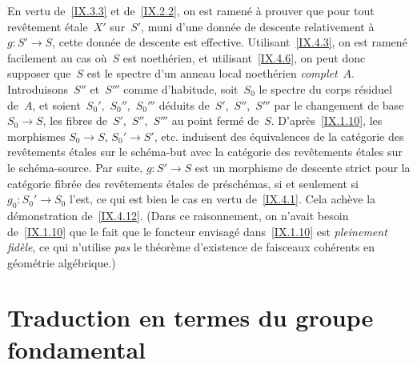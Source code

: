 En vertu de~\ref{IX.3.3} et de~\ref{IX.2.2}, on est ramen\'e \`a
prouver que pour tout rev\^etement \'etale~$X'$ sur~$S'$, muni
d'une donn\'ee de descente relativement \`a $g\colon S'\to S$,
cette donn\'ee de descente est effective. Utilisant~\ref{IX.4.3},
on est ramen\'e facilement
au cas o\`u~$S$ est noeth\'erien, et utilisant~\ref{IX.4.6}, on
peut donc supposer que~$S$ est le spectre d'un anneau local
noeth\'erien \emph{complet}~$A$. Introduisons~$S''$ et~$S'''$ comme
d'habitude, soit~$S_0$ le spectre du corps r\'esiduel de~$A$, et
soient~$S_0'$,~$S_0''$,~$S_0'''$ d\'eduits de~$S'$,~$S''$,~$S'''$
par le changement de base $S_0\to S$, \ie les fibres
de~$S'$,~$S''$,~$S'''$ au point ferm\'e de~$S$.
D'apr\`es~\ref{IX.1.10}, les morphismes $S_0\to S$, $S_0'\to S'$,
etc. induisent des \'equivalences de la cat\'egorie des
rev\^etements \'etales sur le sch\'ema-but avec la cat\'egorie
des rev\^etements \'etales sur le sch\'ema-source. Par suite,
$g\colon S'\to S$ est un morphisme de descente strict pour la
cat\'egorie fibr\'ee des rev\^etements \'etales de
pr\'esch\'emas, si et seulement si $g_0\colon S_0'\to S_0$ l'est,
ce qui est bien le cas en vertu de~\ref{IX.4.1}. Cela ach\`eve la
d\'emonstration de~\ref{IX.4.12}. (Dans ce raisonnement, on n'avait
besoin de~\ref{IX.1.10} que le fait que le foncteur envisag\'e
dans~\ref{IX.1.10} est \emph{pleinement fidèle}, ce qui n'utilise
\emph{pas} le th\'eor\`eme d'existence de faisceaux coh\'erents
en g\'eom\'etrie alg\'ebrique.)

\section{Traduction en termes du groupe fondamental}
\label{IX.5}

